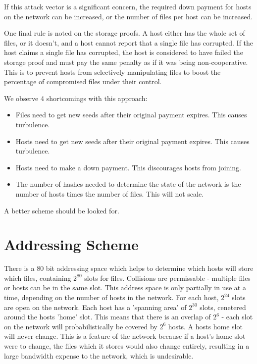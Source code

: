 \documentclass[twocolumn]{article}
\begin{document}
If this attack vector is a significant concern, the required down payment for hosts on the network can be increased, or the number of files per host can be increased.

One final rule is noted on the storage proofs.
A host either has the whole set of files, or it doesn't, and a host cannot report that a single file has corrupted.
If the host claims a single file has corrupted, the host is considered to have failed the storage proof and must pay the same penalty as if it was being non-cooperative.
This is to prevent hosts from selectively manipulating files to boost the percentage of compromised files under their control.

We observe 4 shortcomings with this approach:
\begin{itemize}
	\item Files need to get new seeds after their original payment expires. This causes turbulence.
	\item Hosts need to get new seeds after their original payment expires. This causes turbulence.
	\item Hosts need to make a down payment. This discourages hosts from joining.
	\item The number of hashes needed to determine the state of the network is the number of hosts times the number of files. This will not scale.
\end{itemize}
A better scheme should be looked for.

\iffalse
\section{Addressing Scheme}
There is a 80 bit addressing space which helps to determine which hosts will store which files, containing $2^{80}$ slots for files.
Collisions are permissable - multiple files or hosts can be in the same slot.
This address space is only partially in use at a time, depending on the number of hosts in the network. For each host, $2^{24}$ slots are open on the network.
Each host has a 'spanning area' of $2^{30}$ slots, cenetered around the hosts 'home' slot. This means that there is an overlap of $2^6$ - each slot on the network will probabilistically be covered by $2^6$ hosts.
A hosts home slot will never change.
This is a feature of the network because if a host's home slot were to change, the files which it stores would also change entirely, resulting in a large bandwidth expense to the network, which is undesirable.
\end{document}

